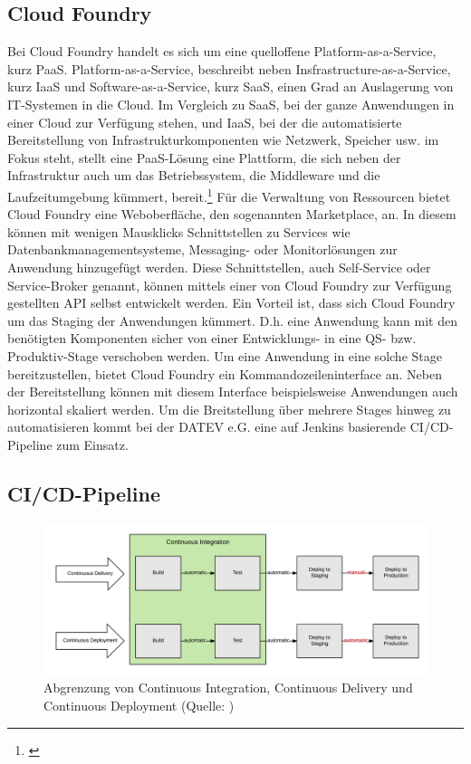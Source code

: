 \subsection{\glqq Cloud Foundry\grqq}
Bei Cloud Foundry handelt es sich um eine quelloffene Platform-as-a-Service, kurz PaaS.
Platform-as-a-Service, beschreibt neben Insfrastructure-as-a-Service, kurz IaaS und Software-as-a-Service, kurz SaaS, einen Grad an Auslagerung von IT-Systemen in die Cloud.
Im Vergleich zu SaaS, bei der ganze Anwendungen in einer Cloud zur Verfügung stehen, und IaaS, bei der die automatisierte Bereitstellung von Infrastrukturkomponenten wie Netzwerk, Speicher usw. im Fokus steht, stellt eine PaaS-Lösung eine Plattform, die sich neben der Infrastruktur auch um das Betriebssystem, die Middleware und die Laufzeitumgebung kümmert, bereit.\footnote{\cite{ipsaas.25.2.2020}}
Für die Verwaltung von Ressourcen bietet Cloud Foundry eine Weboberfläche, den sogenannten \glqq Marketplace\grqq, an.
In diesem können mit wenigen Mausklicks Schnittstellen zu Services wie Datenbankmanagementsysteme, Messaging- oder Monitorlösungen zur Anwendung hinzugefügt werden.
Diese Schnittstellen, auch \glqq Self-Service\grqq{} oder \glqq Service-Broker\grqq{} genannt, können mittels einer von Cloud Foundry zur Verfügung gestellten API selbst entwickelt werden.
Ein Vorteil ist, dass sich Cloud Foundry um das Staging der Anwendungen kümmert.
D.h. eine Anwendung kann mit den benötigten Komponenten sicher von einer Entwicklungs- in eine QS- bzw. Produktiv-Stage verschoben werden. 
Um eine Anwendung in eine solche Stage bereitzustellen, bietet Cloud Foundry ein Kommandozeileninterface an.
Neben der Bereitstellung können mit diesem Interface beispielsweise Anwendungen auch horizontal skaliert werden.
Um die Breitstellung über mehrere Stages hinweg zu automatisieren kommt bei der DATEV e.G. eine auf Jenkins basierende CI/CD-Pipeline zum Einsatz.
\cite{foundry.23.2.2020}

\subsection{\glqq CI/CD-Pipeline\grqq}\label{sec:cicd}
\begin{figure}[h]
	\centering
	\includegraphics[width=\textwidth]{figures/ci-cd-flow-desktop_1.png}
	\caption{Abgrenzung von Continuous Integration, Continuous Delivery und Continuous Deployment  (Quelle: \cite{cicdbild.25.2.2020})}
	\label{fig:ci}
\end{figure}

